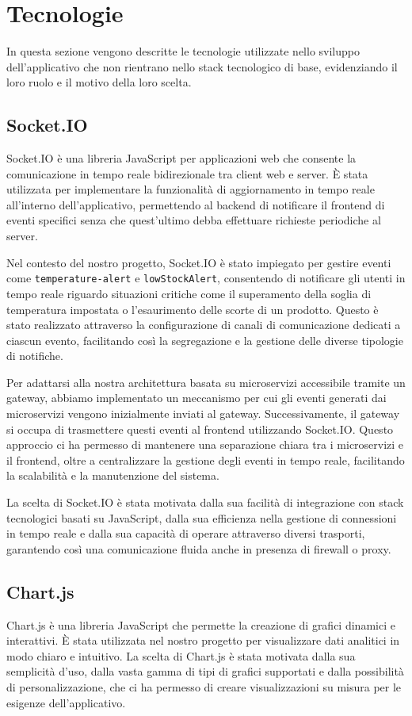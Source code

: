 \section{Tecnologie}

In questa sezione vengono descritte le tecnologie utilizzate nello sviluppo dell'applicativo che non rientrano nello stack tecnologico di base, evidenziando il loro ruolo e il motivo della loro scelta.

\subsection{Socket.IO}
Socket.IO è una libreria JavaScript per applicazioni web che consente la comunicazione in tempo reale bidirezionale tra client web e server. È stata utilizzata per implementare la funzionalità di aggiornamento in tempo reale all'interno dell'applicativo, permettendo al backend di notificare il frontend di eventi specifici senza che quest'ultimo debba effettuare richieste periodiche al server.

Nel contesto del nostro progetto, Socket.IO è stato impiegato per gestire eventi come \texttt{temperature-alert} e \texttt{lowStockAlert}, consentendo di notificare gli utenti in tempo reale riguardo situazioni critiche come il superamento della soglia di temperatura impostata o l'esaurimento delle scorte di un prodotto. Questo è stato realizzato attraverso la configurazione di canali di comunicazione dedicati a ciascun evento, facilitando così la segregazione e la gestione delle diverse tipologie di notifiche.

Per adattarsi alla nostra architettura basata su microservizi accessibile tramite un gateway, abbiamo implementato un meccanismo per cui gli eventi generati dai microservizi vengono inizialmente inviati al gateway. Successivamente, il gateway si occupa di trasmettere questi eventi al frontend utilizzando Socket.IO. Questo approccio ci ha permesso di mantenere una separazione chiara tra i microservizi e il frontend, oltre a centralizzare la gestione degli eventi in tempo reale, facilitando la scalabilità e la manutenzione del sistema.

La scelta di Socket.IO è stata motivata dalla sua facilità di integrazione con stack tecnologici basati su JavaScript, dalla sua efficienza nella gestione di connessioni in tempo reale e dalla sua capacità di operare attraverso diversi trasporti, garantendo così una comunicazione fluida anche in presenza di firewall o proxy.

\subsection{Chart.js}
Chart.js è una libreria JavaScript che permette la creazione di grafici dinamici e interattivi. È stata utilizzata nel nostro progetto per visualizzare dati analitici in modo chiaro e intuitivo. La scelta di Chart.js è stata motivata dalla sua semplicità d'uso, dalla vasta gamma di tipi di grafici supportati e dalla possibilità di personalizzazione, che ci ha permesso di creare visualizzazioni su misura per le esigenze dell'applicativo.

